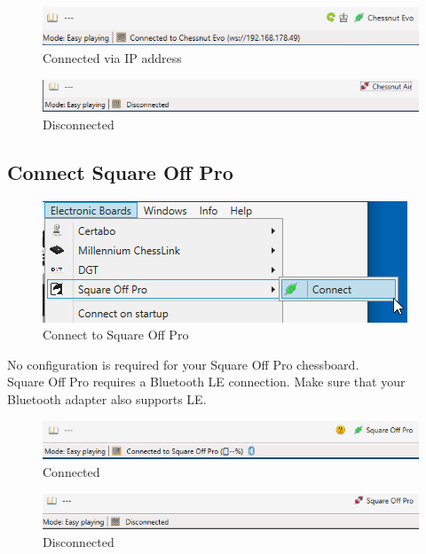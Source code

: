 \documentclass[11pt,a4paper]{article}
\begin{document}
\begin{figure}[H]
	\centering
	\includegraphics[scale=0.7]{ChessnutEvo6.png}
	\caption{Connected via IP address}
	\label{fig:ChessnutEvo2}
\end{figure}


\begin{figure}[H]
	\centering
	\includegraphics[scale=0.7]{ChessnutAir3.png}
	\caption{Disconnected}
	\label{fig:ChessnutEvo3}
\end{figure}



\subsection{Connect Square Off Pro} \label{ConfigureSquareOff}
\begin{figure}[H]
	\centering
	\includegraphics[scale=1.0]{SquareOffPro1.png}
	\caption{Connect to Square Off Pro }
	\label{fig:SquareOffPro1}
\end{figure}

No configuration is required for your Square Off Pro chessboard.\\
Square Off Pro requires a Bluetooth LE connection. Make sure that your Bluetooth adapter also supports LE.

\begin{figure}[H]
	\centering
	\includegraphics[scale=0.8]{SquareOffPro2.png}
	\caption{Connected}
	\label{fig:SquareOffPro2}
\end{figure}

\begin{figure}[H]
	\centering
	\includegraphics[scale=0.8]{SquareOffPro3.png}
	\caption{Disconnected}
	\label{fig:SquareOffPro3}
\end{figure}
\end{document}
